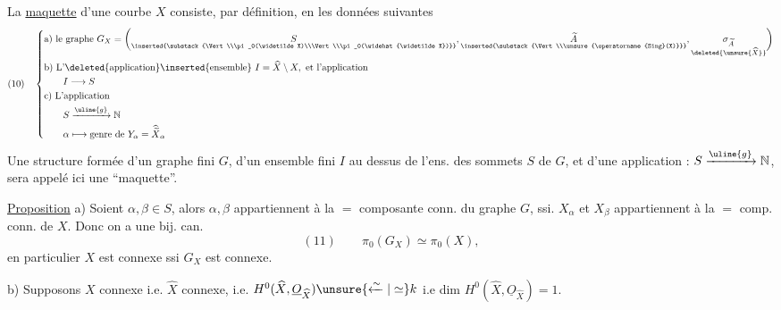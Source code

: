 La \uline{maquette} d'une courbe  $X$ consiste, par définition, en les données suivantes
\[
(10)\quad\left\{\begin{aligned}
&\text{a) le graphe }G_X=\biggl(
\underset{\inserted{\substack{\Vert\\\pi_0(\widetilde X)\\\Vert\\\pi_0(\widehat{\widetilde X})}}}{S},
\underset{\inserted{\substack{\Vert\\\unsure{\operatorname{Sing}(X)}}}}{\widetilde A},
\underset{\deleted{\unsure{\widehat X}}}{\sigma_{\widetilde A}}
\biggr)\\
&\text{b) L'}\deleted{\text{application}}\inserted{\text{ensemble}}\ I=\widehat X\setminus X,\text{ et l'application}\\
&\qquad I\longrightarrow S\\
&\text{c) L'application}\\
&\qquad S\xrightarrow{\uline{g}}\mathbb N\\
&\qquad\alpha\longmapsto\text{genre de }Y_\alpha=\widehat{\widetilde X}_\alpha
\end{aligned}\right.
\]
Une structure formée d'un graphe fini $G$, d'un ensemble fini $I$  au dessus de l'ens. des sommets $S$ de $G$, et d'une application  : $S\xrightarrow{\uline{g}}\mathbb N$, sera
appelé ici une ``maquette''.

\uline{Proposition} 
a) Soient $\alpha,\beta\in S$, alors $\alpha,\beta$ appartiennent à la $=$ composante conn. du graphe $G$, ssi. $X_\alpha$ et $X_\beta$ appartiennent à la $=$ comp. conn. de $X$. Donc  on a une bij. can.
\[
(11)\qquad\pi_0(G_X)\simeq\pi_0(X),
\]
en particulier $X$ est connexe ssi $G_X$ est connexe.

b) Supposons $X$ connexe i.e. $\widehat X$ connexe, i.e. $H^0(\widehat X,\underline O_{\widehat X})\unsure{\xleftarrow{\sim}|\simeq}k$ i.e dim $H^0(\widehat X,\underline O_{\widehat X})=1$.

